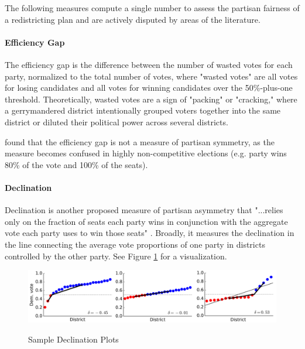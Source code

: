 The following measures compute a single number to assess the partisan fairness of a redistricting plan and are actively disputed by areas of the literature.

\paragraph{Efficiency Gap}
\label{sec:effgap}

The efficiency gap is the difference between the number of wasted votes for each party, normalized to the total number of votes, where "wasted votes" are all votes for losing candidates and all votes for winning candidates over the 50\%-plus-one threshold. Theoretically, wasted votes are a sign of "packing" or "cracking," where a gerrymandered district intentionally grouped voters together into the same district or diluted their political power across several districts. \parencite{stephanopoulos2014}

\textcite{veomett2018} found that the efficiency gap is not a measure of partisan symmetry, as the measure becomes confused in highly non-competitive elections (e.g. party wins 80\% of the vote and 100\% of the seats). 

\paragraph{Declination}
\label{sec:declination}

Declination is another proposed measure of partisan asymmetry that "...relies only on the fraction of seats each party wins in conjunction with the aggregate vote each party uses to win those seats" \parencite[3]{warrington2018}. Broadly, it measures the declination in the line connecting the average vote proportions of one party in districts controlled by the other party. See Figure \ref{fig:dec} for a visualization. 

\begin{figure}
    \centering
    \caption{Sample Declination Plots}
    \includegraphics[width=\textwidth]{img/dec.PNG}
    \label{fig:dec}
    \raggedright
\end{figure}

